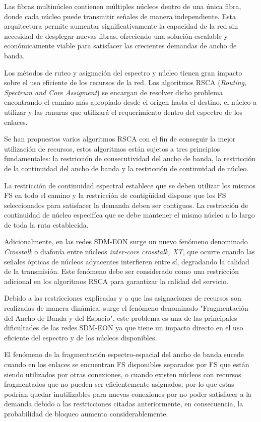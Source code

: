 Las fibras multinúcleo contienen múltiples núcleos dentro de una única fibra, donde cada núcleo puede transmitir señales de manera independiente. Esta arquitectura permite aumentar significativamente la capacidad de la red sin necesidad de desplegar nuevas fibras, ofreciendo una solución escalable y económicamente viable para satisfacer las crecientes demandas de ancho de banda.
%

Los métodos de ruteo y asignación del espectro y núcleo tienen gran impacto sobre el uso eficiente de los recursos de la red. Los algoritmos RSCA (\textit{Routing, Spectrum and Core Assigment}) se encargan de resolver dicho problema encontrando el camino más apropiado desde el origen hasta el destino, el núcleo a utilizar y las ranuras que utilizará el requerimiento dentro del espectro de los enlaces.
%

Se han propuestos varios algoritmos RSCA con el fin de conseguir la mejor utilización de recursos, estos algoritmos están sujetos a tres principios fundamentales: la restricción de consecutividad del ancho de banda, la restricción de la continuidad del ancho de banda y la restricción de continuidad de núcleo. 
%

La restricción de continuidad espectral establece que se deben utilizar los mismos FS en todo el camino y la restricción de contigüidad dispone que los FS seleccionados para satisfacer la demanda deben ser contiguos. La restricción de continuidad de núcleo especifíca que se debe mantener el mismo núcleo a lo largo de toda la ruta establecida.
%

Adicionalmente, en las redes SDM-EON surge un nuevo fenómeno denominado \textit{Crosstalk} o diafonía entre núcleos \textit{inter-core crosstalk, XT}, que ocurre cuando las señales ópticas de núcleos adyacentes interfieren entre sí, degradando la calidad de la transmisión. Este fenómeno debe ser considerado como una restricción adicional en los algoritmos RSCA para garantizar la calidad del servicio.
%

Debido a las restricciones explicadas y a que las asignaciones de recursos son realizadas de manera dinámica, surge el fenómeno denominado "Fragmentación del Ancho de Banda y del Espacio", este problema es una de las principales dificultades de las redes SDM-EON ya que tiene un impacto directo en el uso eficiente del espectro y de los núcleos disponibles.
%

El fenómeno de la fragmentación espectro-espacial del ancho de banda sucede cuando en los enlaces se encuentran FS disponibles separados por FS que están siendo utilizados por otras conexiones, o cuando existen  núcleos con recursos fragmentados que no pueden ser eficientemente asignados, por lo que estas podrían quedar inutilizables para nuevas conexiones por no poder satisfacer a la demanda debido a las restricciones citadas anteriormente, en consecuencia, la probabilidad de bloqueo \cite{shi2013effect} aumenta considerablemente.
%

